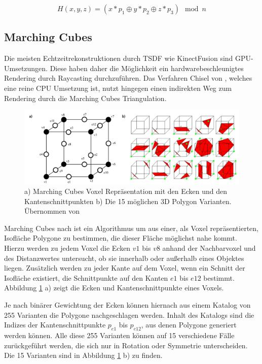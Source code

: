 \begin{equation}\label{eq:spatial_hash}
H(x,y,z) = (x * p_1 \oplus y * p_2 \oplus z * p_3) \mod n
\end{equation}

\subsection{Marching Cubes}

Die meisten Echtzeitrekonstruktionen durch TSDF wie KinectFusion sind GPU-Umsetzungen. Diese haben daher die Möglichkeit ein hardwarebeschleunigtes Rendering durch Raycasting durchzuführen. Das Verfahren Chisel von \citet{Klingensmith_2015_7924}, welches eine reine CPU Umsetzung ist, nutzt hingegen einen indirekten Weg zum Rendering durch die Marching Cubes Triangulation. 

\begin{figure}[h]
  \centering
	\includegraphics[width=1.0\textwidth]{content/images/methods/marchingcubes.png} 
  \caption{a) Marching Cubes Voxel Repräsentation mit den Ecken und den Kantenschnittpunkten b) Die 15 möglichen 3D Polygon Varianten. Übernommen von \citet{MarchingCubes:online}}
  \label{fig:marchingcubes}
\end{figure}

Marching Cubes nach \citet{lorensen1987marching} ist ein Algorithmus um aus einer, als Voxel repräsentierten, Isofläche Polygone zu bestimmen, die dieser Fläche möglichst nahe kommt. Hierzu werden zu jedem Voxel die Ecken \(v1\) bis \(v8\) anhand der Nachbarvoxel und des Distanzwertes untersucht, ob sie innerhalb oder außerhalb eines Objektes liegen. Zusätzlich werden zu jeder Kante auf dem Voxel, wenn ein Schnitt der Isofläche existiert, die Schnittpunkte auf den Kanten \(e1\) bis \(e12\) bestimmt. Abbildung \ref{fig:marchingcubes} a) zeigt die Ecken und Kantenschnittpunkte eines Voxels. 

Je nach binärer Gewichtung der Ecken können hiernach aus einem Katalog von 255 Varianten die Polygone nachgeschlagen werden. Inhalt des Katalogs sind die Indizes der Kantenschnittpunkte \(p_{e1}\) bis \(p_{e12}\), aus denen Polygone generiert werden können. Alle diese 255 Varianten können auf 15 verschiedene Fälle zurückgeführt werden, die sich nur in Rotation oder Symmetrie unterscheiden. Die 15 Varianten sind in Abbildung \ref{fig:marchingcubes} b) zu finden. \citep{MarchingCubes:online} 

